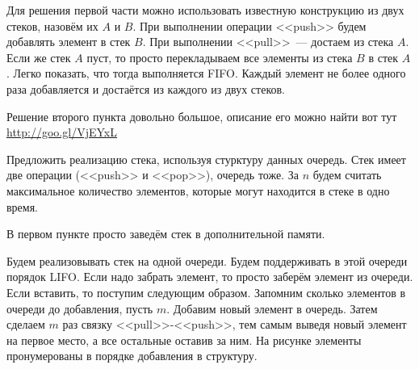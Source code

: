 \documentclass[addpoints]{exam}
\renewcommand{\O}[1]{\mathcal{O}(#1)}
\renewcommand{\o}[1]{\overline{o}(#1)}
\begin{document}
\begin{questions}
\begin{solution}
Для решения первой части можно использовать известную конструкцию из двух стеков, назовём их $A$ и $B$. При выполнении операции <<push>> будем добавлять элемент в стек $B$. При выполнении <<pull>>~--- достаем из стека $A$. Если же стек $A$ пуст, то просто перекладываем все элементы из стека $B$ в стек $A$. Легко показать, что тогда выполняется FIFO. Каждый элемент не более одного раза добавляется и достаётся из каждого из двух стеков.

Решение второго пункта довольно большое, описание его можно найти вот тут \url{http://goo.gl/VjEYxL}

\end{solution}

\question Предложить реализацию стека, используя стурктуру данных очередь. Стек имеет две операции (<<push>> и <<pop>>), очередь тоже. За $n$ будем считать максимальное количество элементов, которые могут находится в стеке в одно время.


\begin{solution}

В первом пункте просто заведём стек в дополнительной памяти.

Будем реализовывать стек на одной очереди. Будем поддерживать в этой очереди порядок LIFO. Если надо забрать элемент, то просто заберём элемент из очереди. Если вставить, то поступим следующим образом. Запомним сколько элементов в очереди до добавления, пусть $m$. Добавим новый элемент в очередь. Затем сделаем $m$ раз связку <<pull>>-<<push>>, тем самым выведя новый элемент на первое место, а все остальные оставив за ним. На рисунке элементы пронумерованы в порядке добавления в структуру.


\end{solution}
\end{questions}
\end{document}
